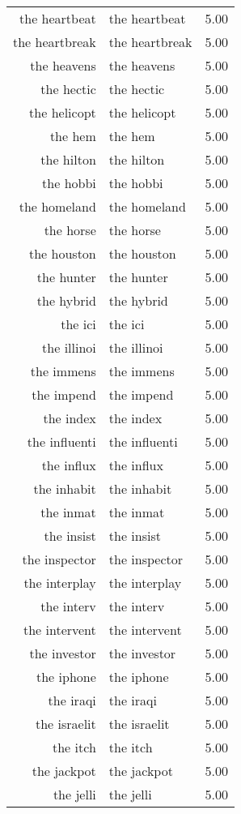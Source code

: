\begin{table}[ht]
\begin{tabular}{rlr}
  the heartbeat & the heartbeat & 5.00 \\ 
  the heartbreak & the heartbreak & 5.00 \\ 
  the heavens & the heavens & 5.00 \\ 
  the hectic & the hectic & 5.00 \\ 
  the helicopt & the helicopt & 5.00 \\ 
  the hem & the hem & 5.00 \\ 
  the hilton & the hilton & 5.00 \\ 
  the hobbi & the hobbi & 5.00 \\ 
  the homeland & the homeland & 5.00 \\ 
  the horse & the horse & 5.00 \\ 
  the houston & the houston & 5.00 \\ 
  the hunter & the hunter & 5.00 \\ 
  the hybrid & the hybrid & 5.00 \\ 
  the ici & the ici & 5.00 \\ 
  the illinoi & the illinoi & 5.00 \\ 
  the immens & the immens & 5.00 \\ 
  the impend & the impend & 5.00 \\ 
  the index & the index & 5.00 \\ 
  the influenti & the influenti & 5.00 \\ 
  the influx & the influx & 5.00 \\ 
  the inhabit & the inhabit & 5.00 \\ 
  the inmat & the inmat & 5.00 \\ 
  the insist & the insist & 5.00 \\ 
  the inspector & the inspector & 5.00 \\ 
  the interplay & the interplay & 5.00 \\ 
  the interv & the interv & 5.00 \\ 
  the intervent & the intervent & 5.00 \\ 
  the investor & the investor & 5.00 \\ 
  the iphone & the iphone & 5.00 \\ 
  the iraqi & the iraqi & 5.00 \\ 
  the israelit & the israelit & 5.00 \\ 
  the itch & the itch & 5.00 \\ 
  the jackpot & the jackpot & 5.00 \\ 
  the jelli & the jelli & 5.00 \\ 

\end{tabular}
\end{table}
